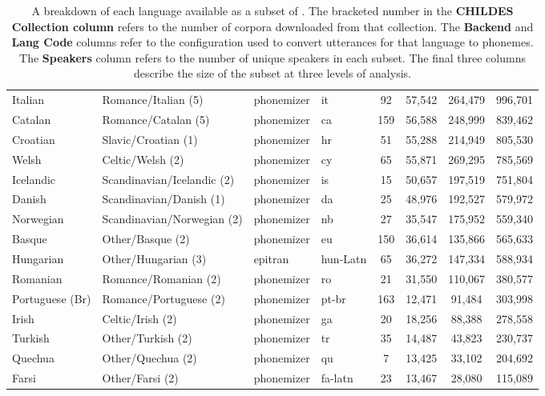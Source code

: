 \begin{table}[t]
\begin{tabular}{llllcccc}
        Italian  & Romance/Italian (5) & phonemizer & it & 92  & 57,542  & 264,479  & 996,701 \\
        Catalan  & Romance/Catalan (5) & phonemizer & ca & 159  & 56,588  & 248,999  & 839,462 \\
        Croatian  & Slavic/Croatian (1) & phonemizer & hr & 51  & 55,288  & 214,949  & 805,530 \\
        Welsh  & Celtic/Welsh (2) & phonemizer & cy & 65  & 55,871  & 269,295  & 785,569 \\
        Icelandic  & Scandinavian/Icelandic (2) & phonemizer & is & 15  & 50,657  & 197,519  & 751,804 \\
        Danish  & Scandinavian/Danish (1) & phonemizer & da & 25  & 48,976  & 192,527  & 579,972 \\
        Norwegian  & Scandinavian/Norwegian (2) & phonemizer & nb & 27  & 35,547  & 175,952  & 559,340 \\
        Basque  & Other/Basque (2) & phonemizer & eu & 150  & 36,614  & 135,866  & 565,633 \\
        Hungarian  & Other/Hungarian (3) & epitran & hun-Latn & 65  & 36,272  & 147,334  & 588,934 \\
        Romanian  & Romance/Romanian (2) & phonemizer & ro & 21  & 31,550  & 110,067  & 380,577 \\
        Portuguese (Br)  & Romance/Portuguese (2) & phonemizer & pt-br & 163  & 12,471  & 91,484  & 303,998 \\
        Irish  & Celtic/Irish (2) & phonemizer & ga & 20  & 18,256  & 88,388  & 278,558 \\
        Turkish  & Other/Turkish (2) & phonemizer & tr & 35  & 14,487  & 43,823  & 230,737 \\
        Quechua  & Other/Quechua (2) & phonemizer & qu & 7  & 13,425  & 33,102  & 204,692 \\
        Farsi  & Other/Farsi (2) & phonemizer & fa-latn & 23  & 13,467  & 28,080  & 115,089 \\
        \bottomrule
    \end{tabular}
    \caption{A breakdown of each language available as a subset of \phonemizedchildes. The bracketed number in the \textbf{CHILDES Collection column} refers to the number of corpora downloaded from that collection. The \textbf{Backend} and \textbf{Lang Code} columns refer to the \corpusphonemizer configuration used to convert utterances for that language to phonemes. The \textbf{Speakers} column refers to the number of unique speakers in each subset. The final three columns describe the size of the subset at three levels of analysis.}
    \label{tab:dataset-phonemized-childes-sections}
\end{table}

